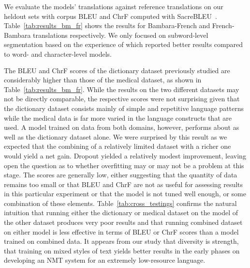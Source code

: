 \documentclass[11pt,a4paper]{article}
\begin{document}
\label{sec:auto-eval}
We evaluate the models' translations against reference translations on our heldout sets with corpus BLEU \citep{papineni2002bleu} and ChrF \citep{popovic2015chrf} computed with SacreBLEU~\citep{post-2018-call}.
Table~\ref{tab:results_bm_fr} shows the results for Bambara-French and French-Bambara translations respectively. We only focused on subword-level segmentation based on the experience of \citet{tapo-etal-2020-neural} which reported better results compared to word- and character-level models.

The BLEU and ChrF scores of the dictionary dataset previously studied are considerably higher than those of the medical dataset, as shown in Table~\ref{tab:results_bm_fr}. While the results on the two different datasets may not be directly comparable, the respective scores were not surprising given that the dictionary dataset consists mainly of simple and repetitive language patterns while the medical data is far more varied in the language constructs that are used. A model trained on data from both domains, however, performs about as well as the dictionary dataset alone. We were surprised by this result as we expected that the combining of a relatively limited dataset with a richer one would yield a net gain. Dropout yielded a relatively modest improvement, leaving open the question as to whether overfitting may or may not be a problem at this stage. The scores are generally low, either suggesting that the quantity of data remains too small or that BLEU and ChrF are not as useful for assessing results in this particular experiment or that the model is not tuned well enough, or some combination of these elements. Table~\ref{tab:cross_testings} confirms the natural intuition that running either the dictionary or medical dataset on the model of the other dataset produces very poor results and that running combined dataset on either model is less effective in terms of BLEU or ChrF scores than a model trained on combined data. It appears from our study that diversity is strength, that training on mixed styles of text yields better results in the early phases on developing an NMT system for an extremely low-resource language.
\end{document}
